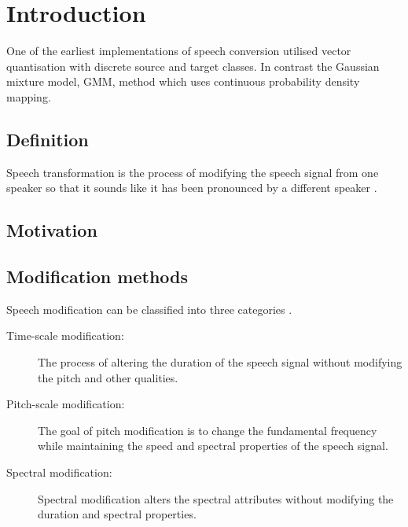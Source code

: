 \chapter{Introduction} %
\label{cha:introduction}
One of the earliest implementations of speech conversion utilised vector quantisation \cite{abe88} with discrete source and target classes. In contrast the Gaussian mixture model, GMM, method \cite{stylianou98} which uses continuous probability density mapping.

\section{Definition} %
\label{sec:definition}
Speech transformation is the process of modifying the speech signal from one speaker so that it sounds like it has been pronounced by a different speaker \cite{stylianou98}.

\section{Motivation} %
\label{sec:motivation}


\section{Modification methods} %
\label{sec:synthesis_methods}
Speech modification can be classified into three categories \cite{nguyen09}.
\begin{description}
	\item[Time-scale modification: ] The process of altering the duration of the speech signal without modifying the pitch and other qualities.
	\item[Pitch-scale modification: ] The goal of pitch modification is to change the fundamental frequency while maintaining the speed and spectral properties of the speech signal.
	\item[Spectral modification: ] Spectral modification alters the spectral attributes without modifying the duration and spectral properties.
\end{description}


